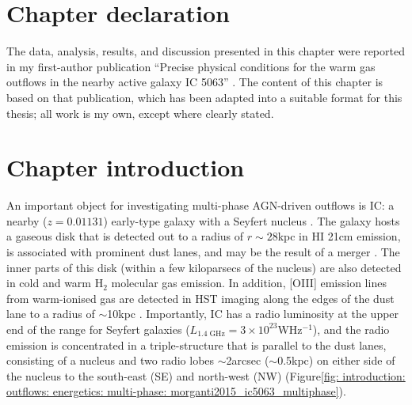 \section*{Chapter declaration}
The data, analysis, results, and discussion presented in this chapter were reported in my first-author publication ``Precise physical conditions for the warm gas outflows in the nearby active galaxy IC 5063'' \citep{Holden2023}. The content of this chapter is based on that publication, which has been adapted into a suitable format for this thesis; all work is my own, except where clearly stated.

\newpage

\section{Chapter introduction}
\label{section: xshooter_ic5063: introduction}


An important object for investigating multi-phase AGN-driven outflows is IC: a nearby ($z=0.01131$) early-type galaxy with a Seyfert nucleus \citep{Danziger1981, Inglis1993}. The galaxy hosts a gaseous disk that is detected out to a radius of $r\sim28$\;kpc in HI 21\;cm emission, is associated with prominent dust lanes, and may be the result of a merger \citep{Morganti1998}. The inner parts of this disk (within a few kiloparsecs of the nucleus) are also detected in cold \citep{Morganti2015} and warm H$_2$ \citep{Tadhunter2014} molecular gas emission. In addition, [OIII] emission lines from warm-ionised gas are detected in HST imaging along the edges of the dust lane to a radius of $\sim$10\;kpc \citep{Morganti1998}.  Importantly, IC has a radio luminosity at the upper end of the range for Seyfert galaxies ($L_\mathrm{1.4\;GHz}=3\times10^{23}$\;W\;Hz$^{-1}$), and the radio emission is concentrated in a triple-structure that is parallel to the dust lanes, consisting of a nucleus and two radio lobes $\sim$2\;arcsec ($\sim$0.5\;kpc) on either side of the nucleus to the south-east (SE) and north-west (NW) (Figure\;\ref{fig: introduction: outflows: energetics: multi-phase: morganti2015_ic5063_multiphase}). 

